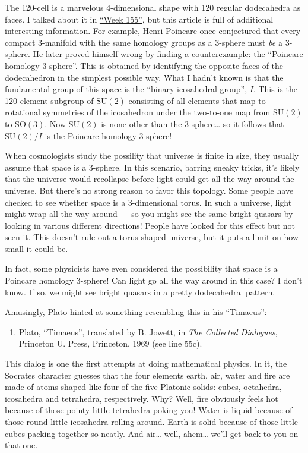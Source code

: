 \documentclass{article}
\def\tightlist{}
\begin{document}
The 120-cell is a marvelous 4-dimensional shape with 120 regular
dodecahedra as faces. I talked about it in
\protect\hyperlink{week155}{``Week 155''}, but this article is full of
additional interesting information. For example, Henri Poincare once
conjectured that every compact 3-manifold with the same homology groups
as a 3-sphere must \emph{be} a 3-sphere. He later proved himself wrong
by finding a counterexample: the ``Poincare homology 3-sphere''. This is
obtained by identifying the opposite faces of the dodecahedron in the
simplest possible way. What I hadn't known is that the fundamental group
of this space is the ``binary icosahedral group'', \(I\). This is the
120-element subgroup of \(\mathrm{SU}(2)\) consisting of all elements
that map to rotational symmetries of the icosahedron under the
two-to-one map from \(\mathrm{SU}(2)\) to \(\mathrm{SO}(3)\). Now
\(\mathrm{SU}(2)\) is none other than the 3-sphere\ldots{} so it follows
that \(\mathrm{SU}(2)/I\) is the Poincare homology 3-sphere!

When cosmologists study the possility that universe is finite in size,
they usually assume that space is a 3-sphere. In this scenario, barring
sneaky tricks, it's likely that the universe would recollapse before
light could get all the way around the universe. But there's no strong
reason to favor this topology. Some people have checked to see whether
space is a 3-dimensional torus. In such a universe, light might wrap all
the way around --- so you might see the same bright quasars by looking
in various different directions! People have looked for this effect but
not seen it. This doesn't rule out a torus-shaped universe, but it puts
a limit on how small it could be.

In fact, some physicists have even considered the possibility that space
is a Poincare homology 3-sphere! Can light go all the way around in this
case? I don't know. If so, we might see bright quasars in a pretty
dodecahedral pattern.

Amusingly, Plato hinted at something resembling this in his ``Timaeus'':

\begin{enumerate}
\def\labelenumi{\arabic{enumi})}
\setcounter{enumi}{5}
\tightlist
\item
  Plato, ``Timaeus'', translated by B. Jowett, in \emph{The Collected
  Dialogues}, Princeton U. Press, Princeton, 1969 (see line 55c).
\end{enumerate}

This dialog is one the first attempts at doing mathematical physics. In
it, the Socrates character guesses that the four elements earth, air,
water and fire are made of atoms shaped like four of the five Platonic
solids: cubes, octahedra, icosahedra and tetrahedra, respectively. Why?
Well, fire obviously feels hot because of those pointy little tetrahedra
poking you! Water is liquid because of those round little icosahedra
rolling around. Earth is solid because of those little cubes packing
together so neatly. And air\ldots{} well, ahem\ldots{} we'll get back to
you on that one.
\end{document}
